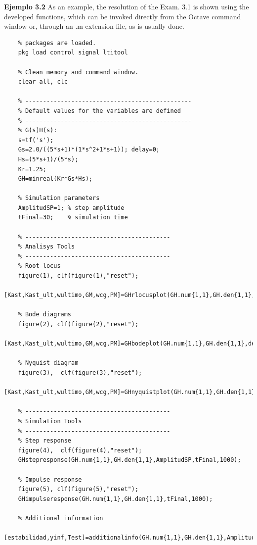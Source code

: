 \vspace{0.4cm}
\textbf{Ejemplo 3.2} \label{ejem02_gh_oct}
As an example, the resolution of the Exam. 3.1 is shown using the developed functions, which can be invoked directly from the Octave command window or, through an .m extension file, as is usually done.

%
\begin{verbatim}
	% packages are loaded.
	pkg load control signal ltitool

	% Clean memory and command window.
	clear all, clc

	% -----------------------------------------------
	% Default values for the variables are defined
	% -----------------------------------------------
	% G(s)H(s):
	s=tf('s');
	Gs=2.0/((5*s+1)*(1*s^2+1*s+1)); delay=0;
	Hs=(5*s+1)/(5*s);
	Kr=1.25;
	GH=minreal(Kr*Gs*Hs);

	% Simulation parameters
	AmplitudSP=1; % step amplitude
	tFinal=30;    % simulation time

	% -----------------------------------------
	% Analisys Tools
	% -----------------------------------------
	% Root locus
	figure(1), clf(figure(1),"reset");
	[Kast,Kast_ult,wultimo,GM,wcg,PM]=GHrlocusplot(GH.num{1,1},GH.den{1,1},Kr,1000);

	% Bode diagrams
	figure(2), clf(figure(2),"reset");
	[Kast,Kast_ult,wultimo,GM,wcg,PM]=GHbodeplot(GH.num{1,1},GH.den{1,1},delay,Kr);

	% Nyquist diagram
	figure(3),  clf(figure(3),"reset");
	[Kast,Kast_ult,wultimo,GM,wcg,PM]=GHnyquistplot(GH.num{1,1},GH.den{1,1},delay,Kr);

	% -----------------------------------------
	% Simulation Tools
	% -----------------------------------------
	% Step response
	figure(4),  clf(figure(4),"reset");
	GHstepresponse(GH.num{1,1},GH.den{1,1},AmplitudSP,tFinal,1000);

	% Impulse response
	figure(5), clf(figure(5),"reset");
	GHimpulseresponse(GH.num{1,1},GH.den{1,1},tFinal,1000);

	% Additional information
	[estabilidad,yinf,Test]=additionalinfo(GH.num{1,1},GH.den{1,1},AmplitudSP,tFinal,1000);
\end{verbatim}

